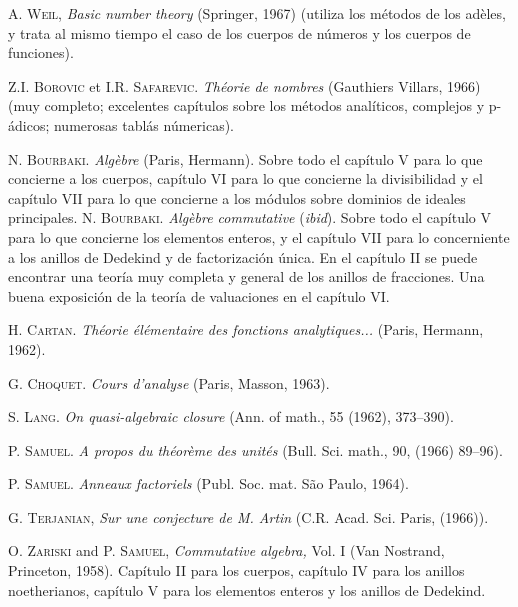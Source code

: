 \documentclass[oneside,bibtotoc,leqno,spanish]{amsbook}
\numberwithin{equation}{section}
\theoremstyle{defi}
\theoremstyle{note}
\theoremstyle{rem}
\numberwithin{theorem}{section}
\numberwithin{proposition}{section}
\numberwithin{definition}{section}
\numberwithin{lemma}{section}
\numberwithin{corollary}{section}
\numberwithin{example}{section}
\numberwithin{footnote}{section}%
\begin{document}
\begin{thebibliography}{21}
\bibitem{} {\scshape A. Weil,} {\itshape Basic number theory} (Springer, 1967) (utiliza los m\'etodos
de los ad\`eles, y trata al mismo tiempo el caso de los cuerpos de n\'umeros y los cuerpos de funciones).

\bibitem{} {\scshape Z.I. Borovic} et {\scshape I.R. Safarevic.} {\itshape Th\'eorie de nombres}
(Gauthiers Villars, 1966)
(muy completo; excelentes cap\'itulos sobre los m\'etodos anal\'iticos, complejos y p-\'adicos; numerosas
tabl\'as n\'umericas).


 {\scshape N. Bourbaki.} {\itshape Alg\`ebre} (Paris, Hermann).
Sobre todo el cap\'itulo V para lo que concierne a los cuerpos,
cap\'itulo VI para lo que concierne la divisibilidad y el
cap\'itulo VII para lo que concierne a los m\'odulos sobre
dominios de ideales principales.
 {\scshape N. Bourbaki.} {\itshape Alg\`ebre commutative} (\textit{ibid}). Sobre todo el
cap\'itulo V para lo que concierne los elementos enteros, y el cap\'itulo VII para lo concerniente a los
anillos de Dedekind y de factorizaci\'on \'unica. En el cap\'itulo II se puede encontrar una teor\'ia muy
completa y general de los anillos de fracciones. Una buena exposici\'on de la teor\'ia de valuaciones en
el cap\'itulo VI.

 {\scshape H. Cartan.} {\itshape Th\'eorie \'el\'ementaire des fonctions analytiques...}
(Paris, Hermann, 1962).

 {\scshape G. Choquet.} {\itshape Cours d'analyse} (Paris, Masson, 1963).

 {\scshape S. Lang.} {\itshape On quasi-algebraic closure} (Ann. of math., 55 (1962), 373--390).

 {\scshape P. Samuel.} {\itshape A propos du th\'eor\`eme des unit\'es}
(Bull. Sci. math., 90, (1966) 89--96).

 {\scshape P. Samuel.} {\itshape Anneaux factoriels} (Publ. Soc. mat. S\~ao Paulo, 1964).

 {\scshape G. Terjanian,} {\itshape Sur une conjecture de M. Artin} (C.R. Acad. Sci. Paris,
(1966)).

 {\scshape O. Zariski} and {\scshape P. Samuel,} {\itshape Commutative algebra,} Vol. I
(Van Nostrand, Princeton, 1958). Cap\'itulo II para los cuerpos, cap\'itulo IV para los anillos noetherianos,
cap\'itulo V para los elementos enteros y los anillos de Dedekind.
\end{thebibliography}

\end{document}
